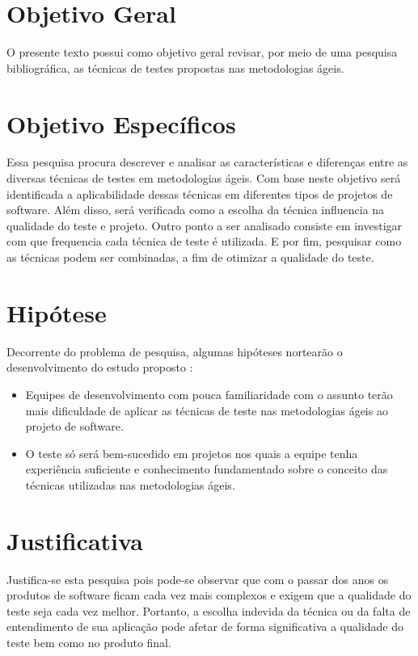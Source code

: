 \section{Objetivo Geral}

O presente texto possui como objetivo geral revisar, por meio de uma pesquisa bibliográfica, as técnicas de testes propostas nas metodologias ágeis.

\section{Objetivo Específicos}

Essa pesquisa procura descrever e analisar as características e diferenças entre as diversas técnicas de testes em metodologias ágeis. Com base neste objetivo será identificada a aplicabilidade dessas técnicas em diferentes tipos de projetos de software. Além disso, será verificada como a escolha da técnica influencia na qualidade do teste e projeto. Outro ponto a ser analisado consiste em investigar com que frequencia cada técnica de teste é utilizada. E por fim, pesquisar como as técnicas podem ser combinadas, a fim de otimizar a qualidade do teste.

\section{Hipótese}
Decorrente do problema de pesquisa, algumas hipóteses nortearão o desenvolvimento do estudo proposto :

\begin{itemize}
    \item Equipes de desenvolvimento com pouca familiaridade com o assunto terão mais dificuldade de aplicar as técnicas de teste nas metodologias ágeis ao projeto de software.
    \item O teste só será bem-sucedido em projetos nos quais a equipe tenha experiência suficiente e conhecimento fundamentado sobre o conceito das técnicas utilizadas nas metodologias ágeis.
\end{itemize}



\section{Justificativa}

Justifica-se esta pesquisa pois pode-se observar que com o passar dos anos os produtos de software ficam cada vez mais complexos e exigem que a qualidade do teste seja cada vez melhor. Portanto, a escolha indevida da técnica ou da falta de entendimento de sua aplicação pode afetar de forma significativa a qualidade do teste bem como no produto final.

